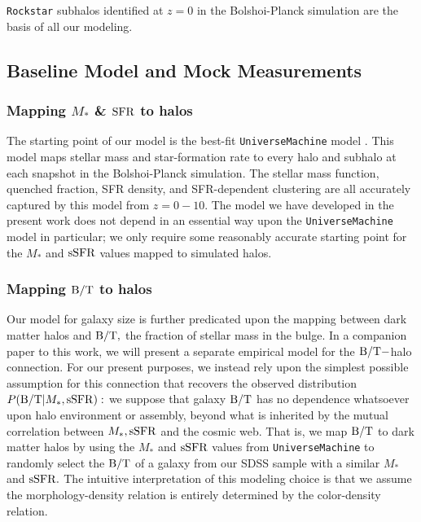 \documentclass[usenatbib,usegraphicx,letterpaper]{mn2e}
\newcommand{\bt}{{\rm B/T}}
\newcommand{\mstar}{M_{\ast}}
\newcommand{\ssfr}{{\rm sSFR}}
\newcommand{\sfr}{{\rm SFR}}
\begin{document}
{\tt Rockstar} subhalos identified at $z=0$ in the Bolshoi-Planck simulation are the basis of all our modeling.

\subsection{Baseline Model and Mock Measurements}
\label{subsec:baselinemock}

\subsubsection{Mapping $\mstar$ \& $\sfr$ to halos}
\label{subsubsec:umachine}

The starting point of our model is the best-fit {\tt UniverseMachine} model \citep[][in prep]{behroozi_etal17}. This model maps stellar mass and star-formation rate to every halo and subhalo at each snapshot in the Bolshoi-Planck simulation. The stellar mass function, quenched fraction, SFR density, and SFR-dependent clustering are all accurately captured by this model from $z=0-10.$ The model we have developed in the present work does not depend in an essential way upon the {\tt UniverseMachine} model in particular; we only require some reasonably accurate starting point for the $\mstar$ and $\ssfr$ values mapped to simulated halos.

\subsubsection{Mapping $\bt$ to halos}
\label{subsubsec:random_bt_model}

Our model for galaxy size is further predicated upon the mapping between dark matter halos and $\bt,$ the fraction of stellar mass in the bulge. In a companion paper to this work, we will present a separate empirical model for the $\bt-$halo connection. For our present purposes, we instead rely upon the simplest possible assumption for this connection that recovers the observed distribution $P(\bt\vert\mstar,\ssfr):$ we suppose that galaxy $\bt$ has no dependence whatsoever upon halo environment or assembly, beyond what is inherited by the mutual correlation between $\mstar, \ssfr$ and the cosmic web. That is, we map $\bt$ to dark matter halos by using the $\mstar$ and $\ssfr$ values from {\tt UniverseMachine} to randomly select the $\bt$ of a galaxy from our SDSS sample with a similar $\mstar$ and $\ssfr.$ The intuitive interpretation of this modeling choice is that we assume the morphology-density relation is entirely determined by the color-density relation.
\end{document}

